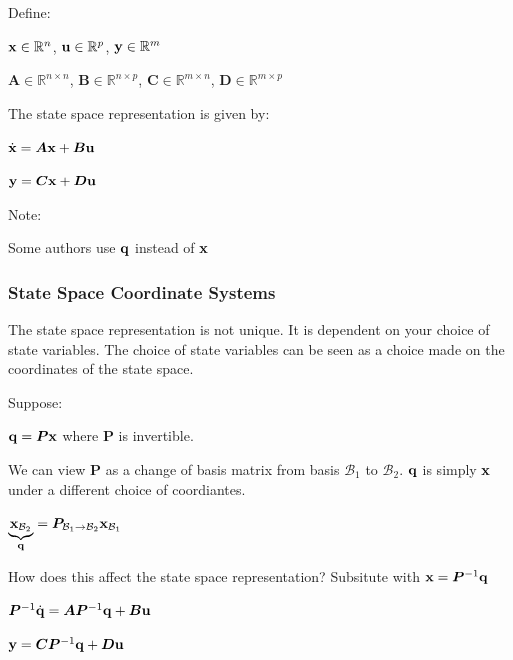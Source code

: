 \documentclass[11pt]{article}
\begin{document}
  \vspace{12pt}

  Define:

  \(\mathbf{x} \in \mathbb{R}^n\),
  \(\mathbf{u} \in \mathbb{R}^p\),
  \(\mathbf{y} \in \mathbb{R}^m\)

  \(\bm{A} \in \mathbb{R}^{n \times n}\),
  \(\bm{B} \in \mathbb{R}^{n \times p}\),
  \(\bm{C} \in \mathbb{R}^{m \times n}\),
  \(\bm{D} \in \mathbb{R}^{m \times p}\)

  \vspace{12pt}

  The state space representation is given by:

  \(\dot{\mathbf{x}} = \bm{A}\mathbf{x} + \bm{B}\mathbf{u}\)

  \(\mathbf{y} = \bm{C}\mathbf{x} + \bm{D}\mathbf{u}\)

  \vspace{12pt}

  Note:

  Some authors use \(\mathbf{q}\) instead of \(\mathbf{x}\)

  \subsubsection{State Space Coordinate Systems}

  The state space representation is not unique. It is dependent on your choice of state variables.
  The choice of state variables can be seen as a choice made on the coordinates of the state space.

  \vspace{12pt}

  Suppose:

  \(\mathbf{q} = \bm{P}\mathbf{x}\) where \(\bm{P}\) is invertible.

  We can view \(\bm{P}\) as a change of basis matrix from basis \(\mathcal{B}_1\) to \(\mathcal{B}_2\). \(\mathbf{q}\) is
  simply \(\mathbf{x}\) under a different choice of coordiantes.

  \(\underbrace{\mathbf{x}_{\mathcal{B}_2}}_{\mathbf{q}} = \bm{P}_{\mathcal{B}_1 \to \mathcal{B}_2}\mathbf{x}_{\mathcal{B}_1}\)

  How does this affect the state space representation? Subsitute with \(\mathbf{x} = \bm{P}^{-1}\mathbf{q}\)

  \(\bm{P}^{-1}\dot{\mathbf{q}} = \bm{A}\bm{P}^{-1}\mathbf{q} + \bm{B}\mathbf{u}\)

  \(\mathbf{y} = \bm{C}\bm{P}^{-1}\mathbf{q} + \bm{D}\mathbf{u}\)
\end{document}
